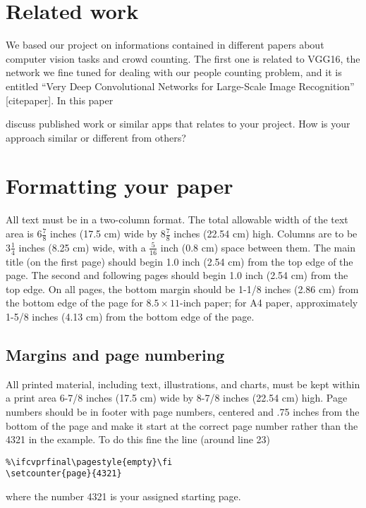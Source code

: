 \documentclass[10pt,twocolumn,letterpaper]{article}
\begin{document}
\section{Related work}

We based our project on informations contained in different papers about computer vision tasks and crowd counting. The first one is related to VGG16, the network we fine tuned for dealing with our people counting problem, and it is entitled “Very Deep Convolutional Networks for Large-Scale Image Recognition” [citepaper]. In this paper 

 discuss published work or similar apps
that relates to your project. How is your approach similar or
different from others? 















\section{Formatting your paper}

All text must be in a two-column format. The total allowable width of the
text area is $6\frac78$ inches (17.5 cm) wide by $8\frac78$ inches (22.54
cm) high. Columns are to be $3\frac14$ inches (8.25 cm) wide, with a
$\frac{5}{16}$ inch (0.8 cm) space between them. The main title (on the
first page) should begin 1.0 inch (2.54 cm) from the top edge of the
page. The second and following pages should begin 1.0 inch (2.54 cm) from
the top edge. On all pages, the bottom margin should be 1-1/8 inches (2.86
cm) from the bottom edge of the page for $8.5 \times 11$-inch paper; for A4
paper, approximately 1-5/8 inches (4.13 cm) from the bottom edge of the
page.

\subsection{Margins and page numbering}

All printed material, including text, illustrations, and charts, must be kept
within a print area 6-7/8 inches (17.5 cm) wide by 8-7/8 inches (22.54 cm)
high.
Page numbers should be in footer with page numbers, centered and .75
inches from the bottom of the page and make it start at the correct page
number rather than the 4321 in the example.  To do this fine the line (around
line 23)
\begin{verbatim}
%\ifcvprfinal\pagestyle{empty}\fi
\setcounter{page}{4321}
\end{verbatim}
where the number 4321 is your assigned starting page.
\end{document}
